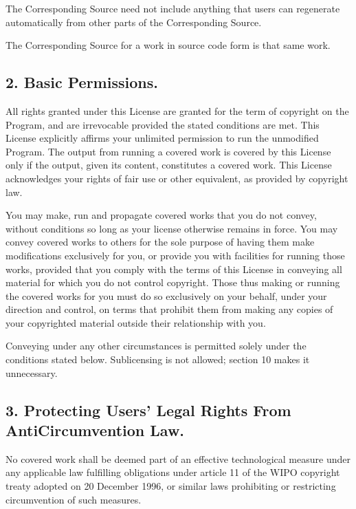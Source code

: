 \documentclass[letterpaper,10pt,english]{sphinxmanual}
\begin{document}
\sphinxAtStartPar
The Corresponding Source need not include anything that users
can regenerate automatically from other parts of the Corresponding
Source.

\sphinxAtStartPar
The Corresponding Source for a work in source code form is that
same work.


\subsection{2. Basic Permissions.}
\label{\detokenize{license:basic-permissions}}
\sphinxAtStartPar
All rights granted under this License are granted for the term of
copyright on the Program, and are irrevocable provided the stated
conditions are met.  This License explicitly affirms your unlimited
permission to run the unmodified Program.  The output from running a
covered work is covered by this License only if the output, given its
content, constitutes a covered work.  This License acknowledges your
rights of fair use or other equivalent, as provided by copyright law.

\sphinxAtStartPar
You may make, run and propagate covered works that you do not
convey, without conditions so long as your license otherwise remains
in force.  You may convey covered works to others for the sole purpose
of having them make modifications exclusively for you, or provide you
with facilities for running those works, provided that you comply with
the terms of this License in conveying all material for which you do
not control copyright.  Those thus making or running the covered works
for you must do so exclusively on your behalf, under your direction
and control, on terms that prohibit them from making any copies of
your copyrighted material outside their relationship with you.

\sphinxAtStartPar
Conveying under any other circumstances is permitted solely under
the conditions stated below.  Sublicensing is not allowed; section 10
makes it unnecessary.


\subsection{3. Protecting Users’ Legal Rights From Anti\sphinxhyphen{}Circumvention Law.}
\label{\detokenize{license:protecting-users-legal-rights-from-anti-circumvention-law}}
\sphinxAtStartPar
No covered work shall be deemed part of an effective technological
measure under any applicable law fulfilling obligations under article
11 of the WIPO copyright treaty adopted on 20 December 1996, or
similar laws prohibiting or restricting circumvention of such
measures.
\end{document}
